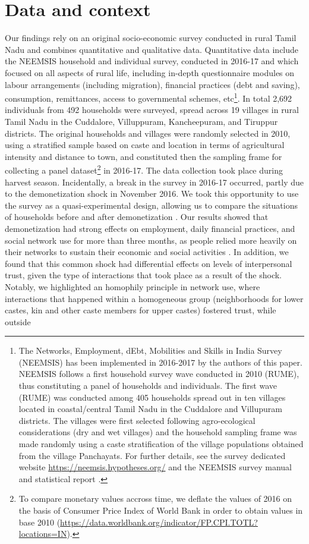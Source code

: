 \documentclass[a4paper, 11pt, onecolumn]{article}
\begin{document}
\section{Data and context}
\label{section:data}


Our findings rely on an original socio-economic survey conducted in rural Tamil Nadu and combines quantitative and qualitative data. Quantitative data include the NEEMSIS household and individual survey, conducted in 2016-17 and which focused on all aspects of rural life, including in-depth questionnaire modules on labour arrangements (including migration), financial practices (debt and saving), consumption, remittances, access to governmental schemes, etc\footnote{The Networks, Employment, dEbt, Mobilities and Skills in India Survey (NEEMSIS) has been implemented in 2016-2017 by the authors of this paper. NEEMSIS follows a first household survey wave conducted in 2010 (RUME), thus constituting a panel of households and individuals. The first wave (RUME) was conducted among 405 households spread out in ten villages located in coastal/central Tamil Nadu in the Cuddalore and Villupuram districts. The villages were first selected following agro-ecological considerations (dry and wet villages) and the household sampling frame was made randomly using a caste stratification of the village populations obtained from the village Panchayats. For further details, see the survey dedicated website \url{https://neemsis.hypotheses.org/} and the NEEMSIS survey manual and statistical report \citep{Nordman2017, Nordman2019}.}. In total 2,692 individuals from 492 households were surveyed, spread across 19 villages in rural Tamil Nadu in the Cuddalore, Villuppuram, Kancheepuram, and Tiruppur districts. The original households and villages were randomly selected in 2010, using a stratified sample based on caste and location in terms of agricultural intensity and distance to town, and constituted then the sampling frame for collecting a panel dataset\footnote{To compare monetary values accross time, we deflate the values of 2016 on the basis of Consumer Price Index of World Bank in order to obtain values in base 2010 (\url{https://data.worldbank.org/indicator/FP.CPI.TOTL?locations=IN}).} in 2016-17. The data collection took place during harvest season. Incidentally, a break in the survey in 2016-17 occurred, partly due to the demonetization shock in November 2016. We took this opportunity to use the survey as a quasi-experimental design, allowing us to compare the situations of households before and after demonetization \citep{Guerin2017, Hilger2020}. Our results showed that demonetization had strong effects on employment, daily financial practices, and social network use for more than three months, as people relied more heavily on their networks to sustain their economic and social activities \citep{Guerin2017}. In addition, we found that this common shock had differential effects on levels of interpersonal trust, given the type of interactions that took place as a result of the shock. Notably, we highlighted an homophily principle in network use, where interactions that happened within a homogeneous group (neighborhoods for lower castes, kin and other caste members for upper castes) fostered trust, while outside 
\end{document}
